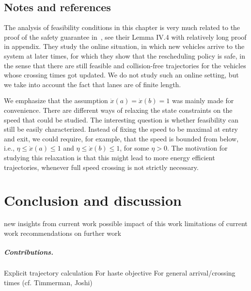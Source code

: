 \documentclass[a4paper]{report}
\theoremstyle{definition}
\theoremstyle{plain}
\begin{document}
\section{Notes and references}

The analysis of feasibility conditions in this chapter is very much related to
the proof of the safety guarantee in~\cite{miculescuPollingsystemsbasedAutonomousVehicle2016}, see their Lemma IV.4 with
relatively long proof in appendix.
%
They study the online situation, in which new vehicles arrive to the system at
later times, for which they show that the rescheduling policy is safe, in the
sense that there are still feasible and collision-free trajectories for the
vehicles whose crossing times got updated.
%
We do not study such an online setting, but we take into account the fact that
lanes are of finite length.

We emphasize that the assumption $\dot{x}(a) = \dot{x}(b) = 1$ was mainly made
for convenience.
%
There are different ways of relaxing the state constraints on the speed that
could be studied.
%
The interesting question is whether feasibility can still be easily characterized.
%
Instead of fixing the speed to be maximal at entry and exit, we could require,
for example, that the speed is bounded from below, i.e., $\eta \leq \dot{x}(a) \leq 1$
and $\eta \leq \dot{x}(b) \leq 1$, for some $\eta > 0$.
%
The motivation for studying this relaxation is that this might lead to more
energy efficient trajectories, whenever full speed crossing is not strictly
necessary.


\chapter{Conclusion and discussion}\label{chap:conclusion}

\begin{outline}
  \1 new insights from current work
  \1 possible impact of this work
  \1 limitations of current work
  \1 recommendations on further work
\end{outline}

\paragraph{Contributions.}
\begin{outline}
  \1 Explicit trajectory calculation
  \2 For haste objective
  \2 For general arrival/crossing times (cf. Timmerman, Joshi)
\end{outline}
\end{document}
